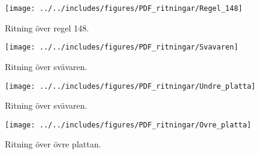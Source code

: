 \begin{landscape}
\begin{figure}[htbp!]
\centering
\texttt{[image: ../../includes/figures/PDF\_ritningar/Regel\_148]}
\caption{Ritning över regel 148.}
\label{fig:regel_148}
\end{figure}
\end{landscape}

\begin{landscape}
\begin{figure}[htbp!]
\centering
\texttt{[image: ../../includes/figures/PDF\_ritningar/Svavaren]}
\caption{Ritning över svävaren.}
\label{fig:Svavaren}
\end{figure}
\end{landscape}

\begin{landscape}
\begin{figure}[htbp!]
\centering
\texttt{[image: ../../includes/figures/PDF\_ritningar/Undre\_platta]}
\caption{Ritning över svävaren.}
\label{fig:Svavaren}
\end{figure}
\end{landscape}

\begin{landscape}
\begin{figure}[htbp!]
\centering
\texttt{[image: ../../includes/figures/PDF\_ritningar/Ovre\_platta]}
\caption{Ritning över övre plattan.}
\label{fig:Ovre_platta}
\end{figure}
\end{landscape}

